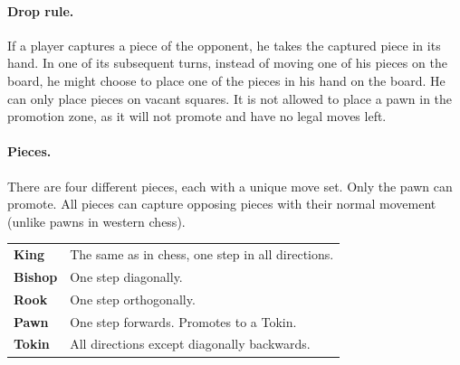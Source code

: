 \documentclass[a4paper, 11pt]{article}
\begin{document}
{\paragraph{Drop rule.} If a player captures a piece of the opponent, he takes the captured piece in its hand. In one of its subsequent turns, instead of moving one of his
pieces on the board, he might choose to place one of the pieces in his hand on the board. He can only place pieces on vacant squares. It is not allowed to place a pawn
in the promotion zone, as it will not promote and have no legal moves left.

\paragraph{Pieces.} There are four different pieces, each with a unique move set. Only the pawn can promote. All pieces can capture opposing pieces with their normal movement
(unlike pawns in western chess).\\
\begin{tabular}{l l}
\textbf{King} & The same as in chess, one step in all directions.\\
\textbf{Bishop} & One step diagonally.\\
\textbf{Rook} & One step orthogonally.\\
\textbf{Pawn} & One step forwards. Promotes to a Tokin.\\
\textbf{Tokin} & All directions except diagonally backwards.\\
\end{tabular}

}
\end{document}
